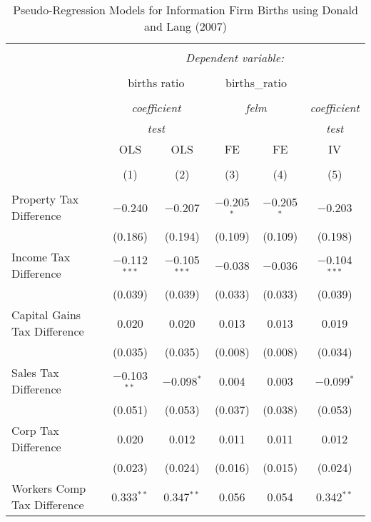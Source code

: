 
\begin{table}[!htbp] \centering 
  \caption{Pseudo-Regression Models for  Information Firm Births using Donald and Lang (2007)} 
  \label{} 
\begin{tabular}{@{\extracolsep{5pt}}lccccc} 
\\[-1.8ex]\hline 
\hline \\[-1.8ex] 
 & \multicolumn{5}{c}{\textit{Dependent variable:}} \\ 
\cline{2-6} 
\\[-1.8ex] & \multicolumn{2}{c}{births ratio} & \multicolumn{2}{c}{births\_ratio} &   \\ 
\\[-1.8ex] & \multicolumn{2}{c}{\textit{coefficient}} & \multicolumn{2}{c}{\textit{felm}} & \textit{coefficient} \\ 
 & \multicolumn{2}{c}{\textit{test}} & \multicolumn{2}{c}{\textit{}} & \textit{test} \\ 
 & OLS & OLS & FE & FE & IV \\ 
\\[-1.8ex] & (1) & (2) & (3) & (4) & (5)\\ 
\hline \\[-1.8ex] 
 Property Tax Difference & $-$0.240 & $-$0.207 & $-$0.205$^{*}$ & $-$0.205$^{*}$ & $-$0.203 \\ 
  & (0.186) & (0.194) & (0.109) & (0.109) & (0.198) \\ 
  Income Tax Difference & $-$0.112$^{***}$ & $-$0.105$^{***}$ & $-$0.038 & $-$0.036 & $-$0.104$^{***}$ \\ 
  & (0.039) & (0.039) & (0.033) & (0.033) & (0.039) \\ 
  Capital Gains Tax Difference & 0.020 & 0.020 & 0.013 & 0.013 & 0.019 \\ 
  & (0.035) & (0.035) & (0.008) & (0.008) & (0.034) \\ 
  Sales Tax Difference & $-$0.103$^{**}$ & $-$0.098$^{*}$ & 0.004 & 0.003 & $-$0.099$^{*}$ \\ 
  & (0.051) & (0.053) & (0.037) & (0.038) & (0.053) \\ 
  Corp Tax Difference & 0.020 & 0.012 & 0.011 & 0.011 & 0.012 \\ 
  & (0.023) & (0.024) & (0.016) & (0.015) & (0.024) \\ 
  Workers Comp Tax Difference & 0.333$^{**}$ & 0.347$^{**}$ & 0.056 & 0.054 & 0.342$^{**}$ \\ 

\end{tabular}
\end{table}
